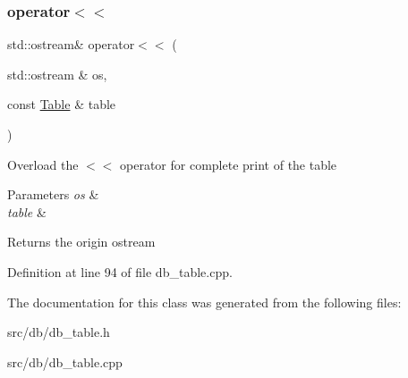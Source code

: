 \subsubsection{\texorpdfstring{operator$<$$<$}{operator<<}}
{\footnotesize\ttfamily std\+::ostream\& operator$<$$<$ (\begin{DoxyParamCaption}\item[{std\+::ostream \&}]{os,  }\item[{const \hyperlink{class_table}{Table} \&}]{table }\end{DoxyParamCaption})\hspace{0.3cm}{\ttfamily [friend]}}

Overload the $<$$<$ operator for complete print of the table 
\begin{DoxyParams}{Parameters}
{\em os} & \\
\hline
{\em table} & \\
\hline
\end{DoxyParams}
\begin{DoxyReturn}{Returns}
the origin ostream 
\end{DoxyReturn}


Definition at line 94 of file db\+\_\+table.\+cpp.



The documentation for this class was generated from the following files\+:\begin{DoxyCompactItemize}
\item 
src/db/db\+\_\+table.\+h\item 
src/db/db\+\_\+table.\+cpp\end{DoxyCompactItemize}
